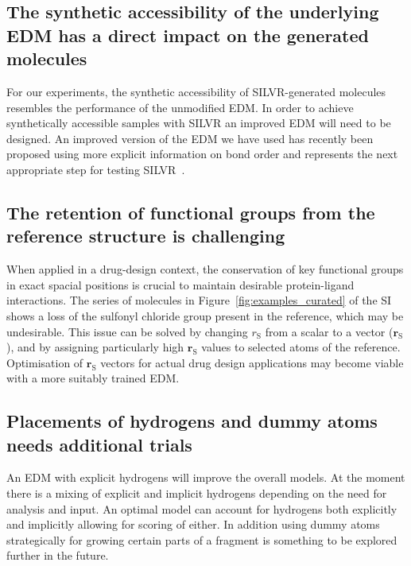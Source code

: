 \documentclass[journal=jacsat,manuscript=article]{achemso}
\begin{document}
\subsection{The synthetic accessibility of the underlying EDM has a direct impact on the generated molecules}
 For our experiments, the synthetic accessibility of SILVR-generated molecules resembles the performance of the unmodified EDM. In order to achieve synthetically accessible samples with SILVR an improved EDM will need to be designed. An improved version of the EDM we have used has recently been proposed using more explicit information on bond order and represents the next appropriate step for testing SILVR~\cite{vignac2023midi}.

\subsection{The retention of functional groups from the reference structure is challenging}
When applied in a drug-design context, the conservation of key functional groups in exact spacial positions is crucial to maintain desirable protein-ligand interactions. The series of molecules in Figure~\ref{fig:examples_curated} of the SI shows a loss of the sulfonyl chloride group present in the reference, which may be undesirable. This issue can be solved by changing $r_{\mathrm{S}}$ from a scalar to a vector ($\mathbf{r}_{\mathrm{S}}$), and by assigning particularly high $\mathbf{r}_{\mathrm{S}}$ values to selected atoms of the reference. Optimisation of $\mathbf{r}_{\mathrm{S}}$ vectors for actual drug design applications may become viable with a more suitably trained EDM.


\subsection{Placements of hydrogens and dummy atoms needs additional trials}
An EDM with explicit hydrogens will improve the overall models. At the moment there is a mixing of explicit and implicit hydrogens depending on the need for analysis and input. An optimal model can account for hydrogens both explicitly and implicitly allowing for scoring of either. In addition using dummy atoms strategically for growing certain parts of a fragment is something to be explored further in the future. 
\end{document}
